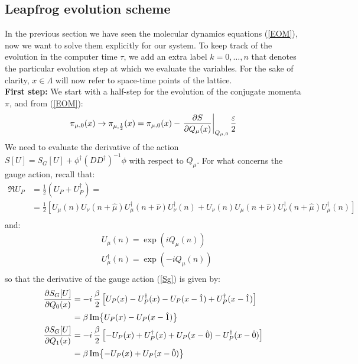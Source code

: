 \subsection{Leapfrog evolution scheme}
In the previous section we have seen the molecular dynamics equations (\ref{EOM}), now we want to solve them explicitly for our system. To keep track of the evolution in the computer time $\tau$, we add an extra label $k = 0, \dots, n$ that denotes the particular evolution step at which we evaluate the variables. For the sake of clarity, $x \in \Lambda$ will now refer to space-time points of the lattice.
\\ \textbf{First step:} We start with a half-step for the evolution of the conjugate momenta $\pi$, and from (\ref{EOM}):
\begin{equation}\label{first step pi}
    \pi_{\mu,0}(x) \to \pi_{\mu, \frac{1}{2}}(x) =  \pi_{\mu,0}(x) - \left. \pdv{S}{Q_\mu(x)} \right\rvert_{Q_{\mu, 0}} \frac{\varepsilon}{2}
\end{equation}
We need to evaluate the derivative of the action $S[U] = S_G[U] + \phi^\dagger (D D^\dagger )^{-1} \phi$ with respect to $Q_\mu$. For what concerns the gauge action, recall that:
\begin{equation*}
\begin{split}
    \Re{U_P} & = \frac{1}{2}(U_P + U_P^\dagger) = \\
             & = \frac{1}{2} \left[  U_\mu(n) U_\nu (n + \hat{\mu}) U^\dagger_\mu(n+\hat{\nu}) U^\dagger_\nu(n) + U_\nu(n) U_\mu (n + \hat{\nu}) U^\dagger_\nu(n+\hat{\mu}) U^\dagger_\mu(n) \right] \\
\end{split}
\end{equation*}
and:
\begin{equation*}
    \begin{split}
        & U_\mu(n) = \exp(iQ_\mu(n)) \\
        & U_\mu^\dagger(n) = \exp(-iQ_\mu(n)) \\
    \end{split}
\end{equation*}
so that the derivative of the gauge action (\ref{Sg}) is given by:
\begin{equation}
\begin{split}
    \pdv{S_G[U]}{Q_0(x)} &= - i \, \frac{\beta}{2} \left[ U_P(x) - U_P^\dagger(x) - U_P(x - \hat{1}) + U_P^\dagger(x - \hat{1}) \right]   \\
                         &= \beta \Im{U_P(x) - U_P(x - \hat{1})} \\
    \pdv{S_G[U]}{Q_1(x)} &= - i \, \frac{\beta}{2} \left[ - U_P(x) + U_P^\dagger(x) + U_P(x - \hat{0}) - U_P^\dagger(x - \hat{0}) \right]   \\
                         &= \beta \Im{- U_P(x) + U_P(x - \hat{0})}                         
\end{split}
\end{equation}
